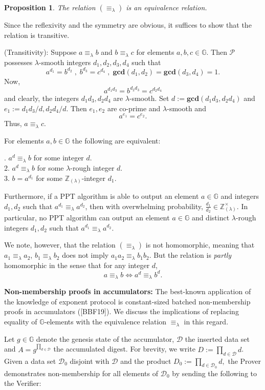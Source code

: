 \documentclass[11pt, lettersize, notitlepage, leqno, footskip=0.6cm]{article}
\newcommand{\bz}{\mathbb Z}
\newcommand{\pl}{\prod\limits}
\newcommand{\LRA}{\Longleftrightarrow}
\newcommand{\eqlam}{\equiv_{\lam}}
\newcommand{\mc}{\mathcal}
\newcommand{\mb}{\mathbb}
\newcommand{\mbf}{\mathbf}
\newcommand{\lam}{\lambda}
\newcommand{\bzlam}{\bz_{(\lam)}}
\newcommand{\vs}{\vspace{-0.15cm}}
\newcommand{\noin}{\noindent}
\newcommand{\op}{overwhelming probability}
\newcommand{\GCD}{\mbf{gcd}}
\newtheorem{Prop}[Thm]{Proposition}
\numberwithin{equation}{section}
\begin{document}
\begin{Prop} The relation $(\equiv_{\lam})$ is an equivalence relation.\end{Prop}

\begin{prf} Since the reflexivity and the symmetry are obvious, it suffices to show that the relation is transitive.

\noindent (Transitivity): Suppose $a \equiv_{\lam} b$ and $b \equiv_{\lam} c$ for elements $a, b, c\in\mb{G}$. Then $\mc{P}$ possesses $\lam$-smooth integers $d_1,d_2, d_3, d_4$ such that \vs $$a^{d_1} = b^{d_2}\;,\; b^{d_3} = c^{d_4}\;,\;\GCD(d_1,d_2) = \GCD(d_3,d_4) = 1.$$ Now, \vs $$a^{d_1d_3} = b^{d_2d_3} = c^{d_2 d_4}$$ and clearly, the integers $d_1d_3, d_2 d_4$ are $\lam$-smooth. Set $d:= \GCD(d_1d_3, d_2 d_4)$ and $e_1:= d_1d_3/d, d_2 d_4/d$. Then $e_1,e_2$ are co-prime and $\lam$-smooth and \vs $$ a^{e_1} = c^{e_2} .$$ Thus, $a \equiv_{\lam} c$.\end{prf}

For elements $a,b\in\mb{G}$ the following are equivalent:

\noin 1. $a^d\eqlam b$ for some integer $d$.\\
2. $a^d\eqlam b$ for some $\lam$-rough integer $d$.\\
3. $b = a^{d_1}$ for some $\bzlam$-integer $d_1$.

Furthermore, if a PPT algorithm is able to output an element $a\in\mb{G}$ and integers $d_1,d_2$ such that $a^{d_1}\eqlam a^{d_2}$, then with \op, $\frac{d_1}{d_2}\in\bzlam^{\times}$. In particular, no PPT algorithm can output an element $a\in \mb{G}$ and distinct $\lam$-rough integers $d_1,d_2$ such that $a^{d_1}\eqlam a^{d_2}$.

We note, however, that the relation $(\equiv_{\lam})$ is not homomorphic, meaning that $a_1 \equiv_{\lam} a_2$, $b_1 \equiv_{\lam} b_2$ does not imply $a_1a_2 \eqlam b_1b_2$. But the relation is \textit{partly} homomorphic in the sense that for any integer $d$, \vs $$ a \equiv_{\lam} b \LRA a^d \equiv_{\lam} b^d .$$ \vspace{0.1cm}


\noin \textbf{Non-membership proofs in accumulators:} The  best-known application of the knowledge of exponent protocol is constant-sized batched non-membership proofs in accumulators ([BBF19]). We discuss the implications of replacing equality of $\mb{G}$-elements with the equivalence relation $\eqlam$ in this regard. 

Let $g \in \mb{G}$ denote the genesis state of the accumulator, $\mc{D}$ the inserted data set and $A = g^{\pl_{d\in \mc{D}}}$ the accumulated digest. For brevity, we write $D:= \pl_{d\in \mc{D}} d$. Given a data set $\mc{D}_0$ disjoint with $\mc{D}$ and the product $D_0:= \pl_{d\in \mc{D}_0} d,$ the Prover demonstrates non-membership for all elements of $\mc{D}_0$ by sending the following to the Verifier:
\end{document}
